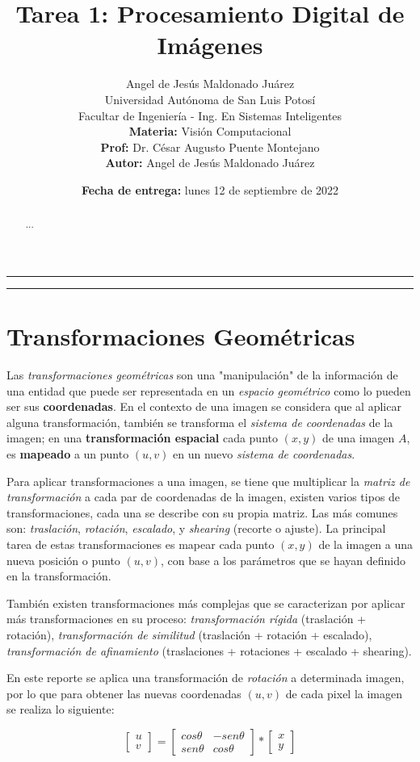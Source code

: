 \documentclass[a4paper, 12pt]{article}
\title{\vspace{-3cm}Tarea 1: Procesamiento Digital de Imágenes}
\author{
    Angel de Jesús Maldonado Juárez\\
    Universidad Autónoma de San Luis Potosí\\
    Facultar de Ingeniería - Ing. En Sistemas Inteligentes\\
    \textbf{Materia:} Visión Computacional\\
    \textbf{Prof:} Dr. César Augusto Puente Montejano\\
    \textbf{Autor:} Angel de Jesús Maldonado Juárez
}
\date{\textbf{Fecha de entrega:} lunes 12 de septiembre de 2022}
\begin{document}
\maketitle

\begin{center}
    \rule{\textwidth}{0.5pt}
    \begin{abstract}
        ...
    \end{abstract}
    \rule{\textwidth}{0.5pt}
\end{center}

\section{Transformaciones Geométricas}
Las \emph{transformaciones geométricas} son una "manipulación" de la información de una entidad que puede ser representada en un \emph{espacio geométrico} como lo pueden ser sus \textbf{coordenadas}. En el contexto de una imagen se considera que al aplicar alguna transformación, también se transforma el \emph{sistema de coordenadas} de la imagen; en una \textbf{transformación espacial} cada punto $(x,y)$ de una imagen $A$, es \textbf{mapeado} a un punto $(u,v)$ en un nuevo \emph{sistema de coordenadas}.

Para aplicar transformaciones a una imagen, se tiene que multiplicar la \emph{matriz de transformación} a cada par de coordenadas de la imagen, existen varios tipos de transformaciones, cada una se describe con su propia matriz. Las más comunes son: \emph{traslación}, \emph{rotación}, \emph{escalado}, y \emph{shearing} (recorte o ajuste). La principal tarea de estas transformaciones es mapear cada punto $(x,y)$ de la imagen a una nueva posición o punto $(u,v)$, con base a los parámetros que se hayan definido en la transformación.

También existen transformaciones más complejas que se caracterizan por aplicar más transformaciones en su proceso: \emph{transformación rígida} (traslación + rotación), \emph{transformación de similitud} (traslación + rotación + escalado), \emph{transformación de afinamiento} (traslaciones + rotaciones + escalado + shearing).

En este reporte se aplica una transformación de \emph{rotación} a determinada imagen, por lo que para obtener las nuevas coordenadas $(u,v)$ de cada pixel la imagen se realiza lo siguiente:

\begin{equation}
    \begin{bmatrix}
        u \\
        v
    \end{bmatrix}
    =
    \begin{bmatrix}
        cos\theta & -sen\theta \\
        sen\theta & cos\theta
    \end{bmatrix}
    *
    \begin{bmatrix}
        x \\
        y
    \end{bmatrix}
\end{equation}
\end{document}
